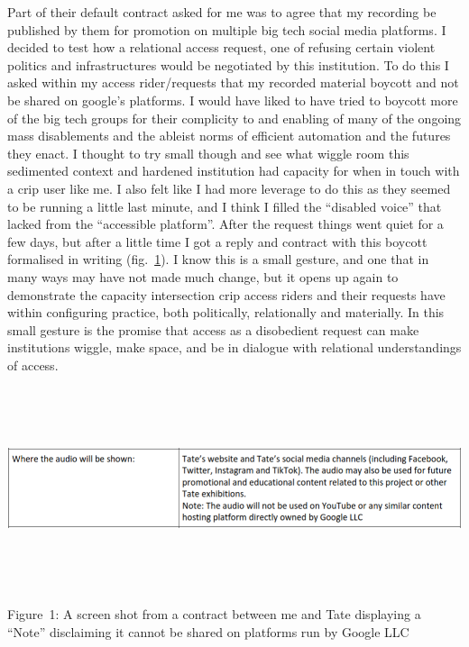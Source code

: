 Part of their default contract asked for me was to agree that my
recording be published by them for promotion on multiple big tech social
media platforms. I decided to test how a relational access request, one
of refusing certain violent politics and infrastructures would be
negotiated by this institution. To do this I asked within my access
rider/requests that my recorded material boycott and not be shared on
google's platforms. I would have liked to have tried to boycott more of
the big tech groups for their complicity to and enabling of many of the
ongoing mass disablements and the ableist norms of efficient automation
and the futures they enact. I thought to try small though and see what
wiggle room this sedimented context and hardened institution had
capacity for when in touch with a crip user like me. I also felt like I
had more leverage to do this as they seemed to be running a little last
minute, and I think I filled the ``disabled voice'' that lacked from the
``accessible platform''. After the request things went quiet for a few
days, but after a little time I got a reply and contract with this
boycott formalised in writing (fig.~\protect\hyperlink{fig:google}{1}).
I know this is a small gesture, and one that in many ways may have not
made much change, but it opens up again to demonstrate the capacity
intersection crip access riders and their requests have within
configuring practice, both politically, relationally and materially. In
this small gesture is the promise that access as a disobedient request
can make institutions wiggle, make space, and be in dialogue with
relational understandings of access.

\includegraphics[width=13.31944in,height=2.33333in]{../../Chapters/media_04_Configure-able_Methods/Pictures/0.png}

Figure~1: A screen shot from a contract between me and Tate displaying a
``Note'' disclaiming it cannot be shared on platforms run by Google LLC

